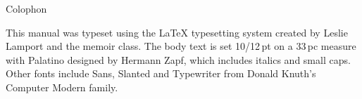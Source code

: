 \documentclass[10pt,letterpaper,extrafontsizes]{memoir}
\newcommand\U[2]{\textrm{#1}\,\textrm{#2}}
\begin{document}

\printindex



\cleardoublepage
\pagestyle{empty}
\null\vfil

\begin{adjustwidth}{1in}{1in}
\begin{center}
{\Large\textsf{Colophon}}
\end{center}
\begin{center}
This manual was typeset using the LaTeX typesetting system
created by Leslie Lamport and the memoir class. 
The body text is set 10/\U{12}{pt} on a
\U{33}{pc} measure with Palatino designed by Hermann Zapf, which includes 
italics and small caps. Other fonts include
Sans, Slanted and Typewriter from Donald Knuth's 
Computer Modern family.

\end{center}

\end{adjustwidth}

\vfil
\end{document}

